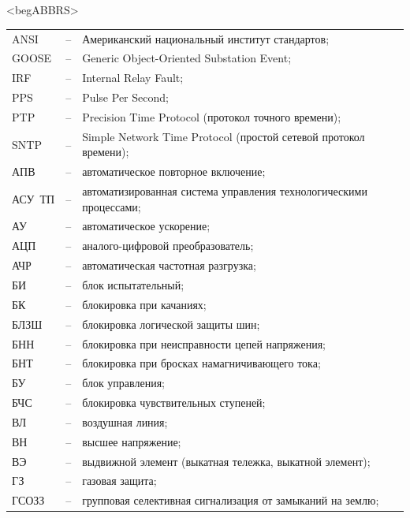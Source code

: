 \color{unimain}\section*{}
{\color{white}\fontsize{0.1pt}{0.1pt}\selectfont<begABBRS>}
\color{black}
\begin{longtable}{>{\raggedright\arraybackslash}m{2cm}>{\raggedright\arraybackslash}m{0.5cm}>{\raggedright\arraybackslash}m{20cm}}
\endfirsthead\endhead\endfoot\endlastfoot
ANSI & -- & Американский национальный институт стандартов; \\
GOOSE & -- & Generic Object-Oriented Substation Event; \\
IRF & -- & Internal Relay Fault; \\
PPS & -- & Pulse Per Second; \\
PTP & -- & Precision Time Protocol (протокол точного времени); \\
SNTP & -- & Simple Network Time Protocol (простой сетевой протокол времени); \\
АПВ & -- & автоматическое повторное включение; \\
АСУ~ТП & -- & автоматизированная система управления технологическими процессами; \\
АУ & -- & автоматическое ускорение; \\
АЦП & -- & аналого-цифровой преобразователь; \\
АЧР & -- & автоматическая частотная разгрузка; \\
БИ & -- & блок испытательный; \\
БК & -- & блокировка при качаниях; \\
БЛЗШ & -- & блокировка логической защиты шин; \\
БНН & -- & блокировка при неисправности цепей напряжения; \\
БНТ & -- & блокировка при бросках намагничивающего тока; \\
БУ & -- & блок управления; \\
БЧС & -- & блокировка чувствительных ступеней; \\
ВЛ & -- & воздушная линия; \\
ВН & -- & высшее напряжение; \\
ВЭ & -- & выдвижной элемент (выкатная тележка, выкатной элемент); \\
ГЗ & -- & газовая защита; \\
ГСОЗЗ & -- & групповая селективная сигнализация от замыканий на землю; \\

\end{longtable}
